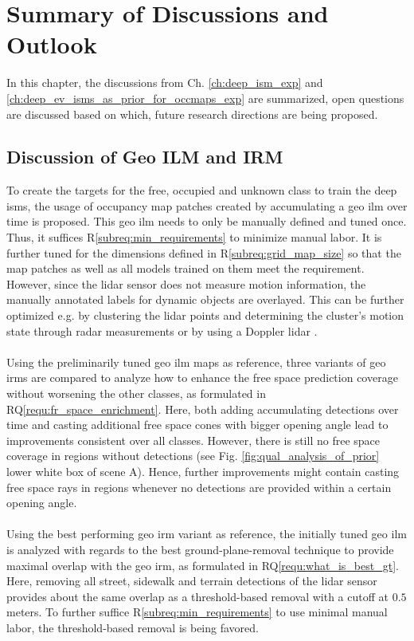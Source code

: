 \chapter{Summary of Discussions and Outlook}
\label{ch:discussion_of_req_n_rq}
In this chapter, the discussions from Ch. \ref{ch:deep_ism_exp} and \ref{ch:deep_ev_isms_as_prior_for_occmaps_exp} are summarized, open questions are discussed based on which, future research directions are being proposed.
%
\section{Discussion of Geo ILM and IRM}
\label{sec:disc_of_geo_ilm_n_irm}
To create the targets for the free, occupied and unknown class to train the deep \gls{ism}s, the usage of occupancy map patches created by accumulating a geo \gls{ilm} over time is proposed. This geo \gls{ilm} needs to only be manually defined and tuned once. Thus, it suffices R\ref{subreq:min_requirements} to minimize manual labor. It is further tuned for the dimensions defined in R\ref{subreq:grid_map_size} so that the map patches as well as all models trained on them meet the requirement. However, since the lidar sensor does not measure motion information, the manually annotated labels for dynamic objects are overlayed. This can be further optimized e.g. by clustering the lidar points and determining the cluster's motion state through radar measurements or by using a Doppler lidar \cite{ma2019moving}.
\\\\
Using the preliminarily tuned geo \gls{ilm} maps as reference, three variants of geo \gls{irm}s are compared to analyze how to enhance the free space prediction coverage without worsening the other classes, as formulated in RQ\ref{requ:fr_space_enrichment}. Here, both adding accumulating detections over time and casting additional free space cones with bigger opening angle lead to improvements consistent over all classes. However, there is still no free space coverage in regions without detections (see Fig. \ref{fig:qual_analysis_of_prior} lower white box of scene A). Hence, further improvements might contain casting free space rays in regions whenever no detections are provided within a certain opening angle.
\\\\
Using the best performing geo \gls{irm} variant as reference, the initially tuned geo \gls{ilm} is analyzed with regards to the best ground-plane-removal technique to provide maximal overlap with the geo \gls{irm}, as formulated in RQ\ref{requ:what_is_best_gt}. Here, removing all street, sidewalk and terrain detections of the lidar sensor provides about the same overlap as a threshold-based removal with a cutoff at $0.5$ meters. To further suffice R\ref{subreq:min_requirements} to use minimal manual labor, the threshold-based removal is being favored.
%
